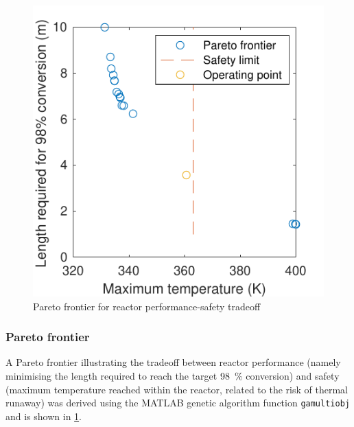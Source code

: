 \begin{figure}[h]
\begin{minipage}[t]{0.45\linewidth}
        \includegraphics{figures/comsol-pareto.pdf}
        \caption{Pareto frontier for reactor performance-safety tradeoff}
        \label{fig:comsol-pareto}
    \end{minipage}
\end{figure}

\subsubsection{Pareto frontier}

A Pareto frontier illustrating the tradeoff between reactor performance (namely minimising the length required to reach the target \SI{98}{\percent} conversion) and safety (maximum temperature reached within the reactor, related to the risk of thermal runaway) was derived using the MATLAB genetic algorithm function \texttt{gamultiobj} and is shown in \cref{fig:comsol-pareto}.

